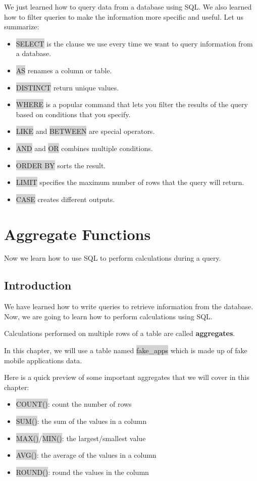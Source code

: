 \documentclass[11pt]{article}
\begin{document}
{{We just learned how to query data from a database using SQL. We also learned how to filter queries to make the information more specific and useful. Let us summarize:
\begin{itemize}[leftmargin = *]
\item \colorbox{lightgray}{SELECT} is the clause we use every time we want to query information from a database.
\item \colorbox{lightgray}{AS} renames a column or table.
\item \colorbox{lightgray}{DISTINCT} return unique values.
\item \colorbox{lightgray}{WHERE} is a popular command that lets you filter the results of the query based on conditions that you specify.
\item \colorbox{lightgray}{LIKE} and \colorbox{lightgray}{BETWEEN} are special operators.
\item \colorbox{lightgray}{AND} and \colorbox{lightgray}{OR} combines multiple conditions.
\item \colorbox{lightgray}{ORDER BY} sorts the result.
\item \colorbox{lightgray}{LIMIT} specifies the maximum number of rows that the query will return.
\item \colorbox{lightgray}{CASE} creates different outputs.
\end{itemize}

\newpage
\section{Aggregate Functions}
Now we learn how to use SQL to perform calculations during a query.
\subsection{Introduction}
We have learned how to write queries to retrieve information from the database. Now, we are going to learn how to perform calculations using SQL.

Calculations performed on multiple rows of a table are called \textbf{aggregates}.

In this chapter, we will use a table named \colorbox{lightgray}{fake\_apps} which is made up of fake mobile applications data.

Here is a quick preview of some important aggregates that we will cover in this chapter:
\begin{itemize}[leftmargin = *]
\item \colorbox{lightgray}{COUNT()}: count the number of rows
\item \colorbox{lightgray}{SUM()}: the sum of the values in a column
\item \colorbox{lightgray}{MAX()}/\colorbox{lightgray}{MIN()}: the largest/smallest value
\item \colorbox{lightgray}{AVG()}: the average of the values in a column
\item \colorbox{lightgray}{ROUND()}: round the values in the column
\end{itemize}

}}
\end{document}
